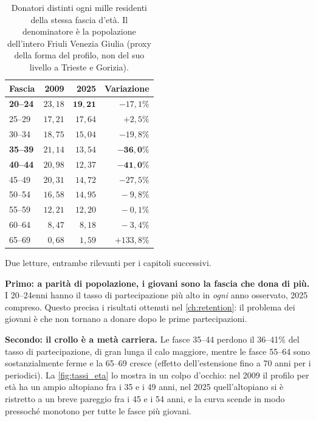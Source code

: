 \begin{table}[ht]
\centering
\caption{Donatori distinti ogni mille residenti della stessa fascia d'età. Il
denominatore è la popolazione dell'intero Friuli Venezia Giulia (proxy della
forma del profilo, non del suo livello a Trieste e Gorizia).}
\label{tab:tassi_eta}
\begin{tabular}{@{}lrrr@{}}
\toprule
\textbf{Fascia} & \textbf{2009} & \textbf{2025} & \textbf{Variazione} \\
\midrule
\textbf{20--24} & $23{,}18$ & $\mathbf{19{,}21}$ & $-17{,}1\%$ \\
25--29 & $17{,}21$ & $17{,}64$ & $+2{,}5\%$ \\
30--34 & $18{,}75$ & $15{,}04$ & $-19{,}8\%$ \\
\textbf{35--39} & $21{,}14$ & $13{,}54$ & $\mathbf{-36{,}0\%}$ \\
\textbf{40--44} & $20{,}98$ & $12{,}37$ & $\mathbf{-41{,}0\%}$ \\
45--49 & $20{,}31$ & $14{,}72$ & $-27{,}5\%$ \\
50--54 & $16{,}58$ & $14{,}95$ & $\phantom{0}-9{,}8\%$ \\
55--59 & $12{,}21$ & $12{,}20$ & $\phantom{0}-0{,}1\%$ \\
60--64 & $\phantom{0}8{,}47$ & $\phantom{0}8{,}18$ & $\phantom{0}-3{,}4\%$ \\
65--69 & $\phantom{0}0{,}68$ & $\phantom{0}1{,}59$ & $+133{,}8\%$ \\
\bottomrule
\end{tabular}
\end{table}

Due letture, entrambe rilevanti per i capitoli successivi.

\textbf{Primo: a parità di popolazione, i giovani sono la fascia che dona di
più.} I 20--24enni hanno il tasso di partecipazione più alto in \emph{ogni}
anno osservato, 2025 compreso. Questo precisa i risultati ottenuti
nel \cref{ch:retention}: il problema dei giovani è che non
tornano a donare dopo le prime partecipazioni.

\textbf{Secondo: il crollo è a metà carriera.} Le fasce 35--44 perdono il
36--41\% del tasso di partecipazione, di gran lunga il calo maggiore, mentre le
fasce 55--64 sono sostanzialmente ferme e la 65--69 cresce (effetto
dell'estensione fino a 70 anni per i periodici). La \cref{fig:tassi_eta} lo
mostra in un colpo d'occhio: nel 2009 il profilo per età ha un ampio altopiano
fra i 35 e i 49 anni, nel 2025 quell'altopiano si è ristretto a un breve
pareggio fra i 45 e i 54 anni, e la curva scende in modo pressoché monotono
per tutte le fasce più giovani.

